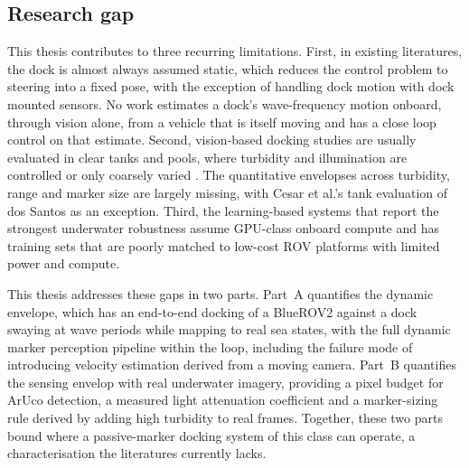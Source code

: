 \subsection{Research gap}

This thesis contributes to three recurring limitations. First, in existing literatures, the dock is almost always assumed static, which reduces the control problem to steering into a fixed pose, with the exception of handling dock motion with dock mounted sensors. No work estimates a dock's wave-frequency motion onboard, through vision alone, from a vehicle that is itself moving and has a close loop control on that estimate. Second, vision-based docking studies are usually evaluated in clear tanks and pools, where turbidity and illumination are controlled or only coarsely varied \cite{liu2017vision,ni2025vision}. The quantitative envelopses across turbidity, range and marker size are largely missing, with Cesar et al.'s tank evaluation of dos Santos as an exception. Third, the learning-based systems that report the strongest underwater robustness assume GPU-class onboard compute and has training sets that are poorly matched to low-cost ROV platforms with limited power and compute.

This thesis addresses these gaps in two parts. Part~A quantifies the dynamic envelope, which has an end-to-end docking of a BlueROV2 against a dock swaying at wave periods while mapping to real sea states, with the full dynamic marker perception pipeline within the loop, including the failure mode of introducing velocity estimation derived from a moving camera. Part~B quantifies the sensing envelop with real underwater imagery, providing a pixel budget for ArUco detection, a measured light attenuation coefficient and a marker-sizing rule derived by adding high turbidity to real frames. Together, these two parts bound where a passive-marker docking system of this class can operate, a characterisation the literatures currently lacks.